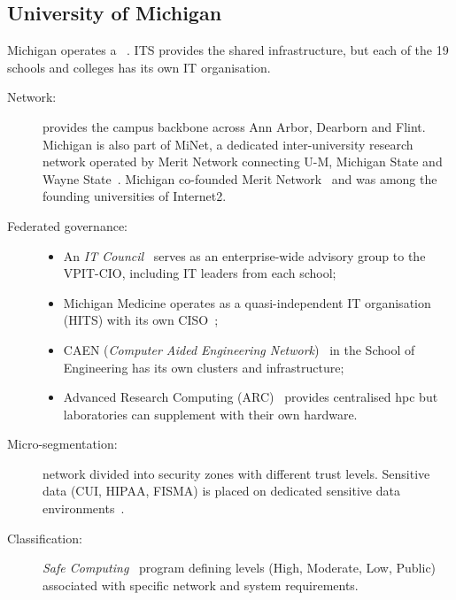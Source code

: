 \subsection{University of Michigan}

Michigan operates a ~\cite{umich-its, umich-it-community}.
ITS provides the shared infrastructure, but each of the 19 schools and
colleges has its own IT organisation.

\begin{description}
    \item[Network:]  provides the campus backbone
    across Ann Arbor, Dearborn and Flint.
    Michigan is also part of MiNet, a dedicated inter-university
    research network operated by Merit Network connecting U-M,
    Michigan State and Wayne State~\cite{umich-core-network}.
    Michigan co-founded Merit Network~\cite{umich-merit} and was among
    the founding universities of Internet2.
    \item[Federated governance:]
    \begin{itemize}[nosep]
        \item An \emph{IT Council}~\cite{umich-it-council} serves as an
        enterprise-wide advisory group to the VPIT-CIO, including IT
        leaders from each school;
        \item Michigan Medicine operates as a quasi-independent IT
        organisation (HITS) with its own
        CISO~\cite{umich-medicine-it};
        \item CAEN (\emph{Computer Aided Engineering
        Network})~\cite{umich-caen} in the School of Engineering has its
        own clusters and infrastructure;
        \item Advanced Research Computing
        (ARC)~\cite{umich-arc} provides centralised \gls{hpc} but laboratories
        can supplement with their own hardware.
    \end{itemize}
    \item[Micro-segmentation:] network divided into security zones with
    different trust levels. Sensitive data (CUI, HIPAA, FISMA) is placed
    on dedicated sensitive data
    environments~\cite{umich-safecomputing}.
    \item[Classification:] \emph{Safe Computing}~\cite{umich-safecomputing}
    program defining levels (High, Moderate, Low, Public) associated
    with specific network and system
    requirements.
\end{description}

